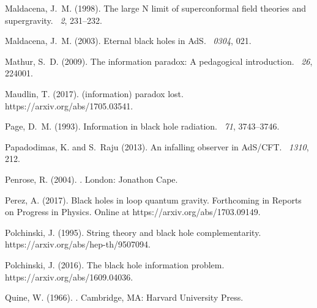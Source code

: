 \documentclass[12pt]{article}
\begin{document}
\begin{thebibliography}{}
Maldacena, J.~M. (1998).
\newblock The large {N} limit of superconformal field theories and
  supergravity.
~{\em 2},
  231--232.

Maldacena, J.~M. (2003).
\newblock Eternal black holes in {A}d{S}.
~{\em 0304}, 021.

Mathur, S.~D. (2009).
\newblock The information paradox: A pedagogical introduction.
~{\em 26}, 224001.

Maudlin, T. (2017).
\newblock (information) paradox lost.
\newblock https://arxiv.org/abs/1705.03541.

Page, D.~M. (1993).
\newblock Information in black hole radiation.
~{\em 71}, 3743--3746.

Papadodimas, K. and S.~Raju (2013).
\newblock An infalling observer in {A}d{S}/{CFT}.
~{\em 1310}, 212.

Penrose, R. (2004).
.
\newblock London: Jonathon Cape.

Perez, A. (2017).
\newblock Black holes in loop quantum gravity.
\newblock Forthcoming in Reports on Progress in Physics. Online at
  https://arxiv.org/abs/1703.09149.

Polchinski, J. (1995).
\newblock String theory and black hole complementarity.
\newblock https://arxiv.org/abs/hep-th/9507094.

Polchinski, J. (2016).
\newblock The black hole information problem.
\newblock https://arxiv.org/abs/1609.04036.

Quine, W. (1966).
.
\newblock Cambridge, MA: Harvard University Press.


\end{thebibliography}
\end{document}
